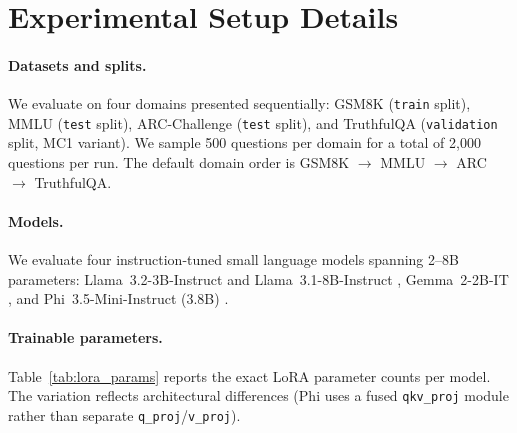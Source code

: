 \renewcommand{\arraystretch}{1.15}

\section{Experimental Setup Details} \label{app:setup}

\paragraph{Datasets and splits.}
We evaluate on four domains presented sequentially: 
GSM8K \citep{cobbe_training_2021} (\texttt{train} split), 
MMLU \citep{hendrycks_measuring_2021} (\texttt{test} split), 
ARC-Challenge \citep{clark_think_2018} (\texttt{test} split), 
and TruthfulQA \citep{lin_truthfulqa_2021} (\texttt{validation} split, MC1 variant).
We sample 500 questions per domain for a total of 2{,}000 questions per run.
The default domain order is GSM8K $\to$ MMLU $\to$ ARC $\to$ TruthfulQA.

\paragraph{Models.}
We evaluate four instruction-tuned small language models spanning 2--8B parameters:
Llama~3.2-3B-Instruct and Llama~3.1-8B-Instruct \citep{grattafiori_llama_2024},
Gemma~2-2B-IT \citep{team_gemma_2024},
and Phi~3.5-Mini-Instruct (3.8B) \citep{abdin_phi3_2024}.

\paragraph{Trainable parameters.}
Table~\ref{tab:lora_params} reports the exact LoRA parameter counts per model.
The variation reflects architectural differences (Phi uses a fused \texttt{qkv\_proj} 
module rather than separate \texttt{q\_proj}/\texttt{v\_proj}).

\begin{table}[htbp]
\centering
\small
{}%
\caption{LoRA trainable parameters per model (rank $r{=}8$).
Llama~3.2-3B: last 4 layers (24--27 of 28);
Llama~3.1-8B: last 8 layers;
Gemma and Phi: last 8 layers
(Gemma: 18--25 of 26; Phi: 24--31 of 32).}
\label{tab:lora_params}
\end{table}

